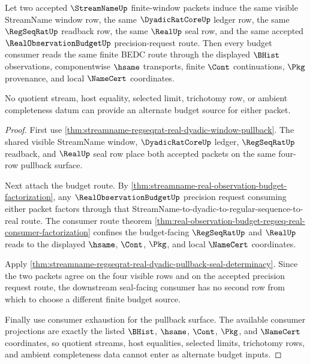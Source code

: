 \begin{theorem}
\label{thm:streamname-real-budget-route-determinacy}
Let two accepted $\StreamNameUp$ finite-window packets induce the same visible
StreamName window row, the same $\DyadicRatCoreUp$ ledger row, the same
$\RegSeqRatUp$ readback row, the same $\RealUp$ seal row, and the same accepted
$\RealObservationBudgetUp$ precision-request route. Then every budget consumer
reads the same finite BEDC route through the displayed $\BHist$ observations,
componentwise $\hsame$ transports, finite $\Cont$ continuations, $\Pkg$
provenance, and local $\NameCert$ coordinates.

No quotient stream, host equality, selected limit, trichotomy row, or ambient
completeness datum can provide an alternate budget source for either packet.
\end{theorem}
\begin{proof}
First use
\autoref{thm:streamname-regseqrat-real-dyadic-window-pullback}. The shared
visible StreamName window, $\DyadicRatCoreUp$ ledger, $\RegSeqRatUp$ readback,
and $\RealUp$ seal row place both accepted packets on the same four-row
pullback surface.

Next attach the budget route. By
\autoref{thm:streamname-real-observation-budget-factorization}, any
$\RealObservationBudgetUp$ precision request consuming either packet factors
through that StreamName-to-dyadic-to-regular-sequence-to-real route. The
consumer route theorem
\autoref{thm:real-observation-budget-regseq-real-consumer-factorization}
confines the budget-facing $\RegSeqRatUp$ and $\RealUp$ reads to the displayed
$\hsame$, $\Cont$, $\Pkg$, and local $\NameCert$ coordinates.

Apply
\autoref{thm:streamname-regseqrat-real-dyadic-pullback-seal-determinacy}. Since
the two packets agree on the four visible rows and on the accepted precision
request route, the downstream seal-facing consumer has no second row from which
to choose a different finite budget source.

Finally use consumer exhaustion for the pullback surface. The available
consumer projections are exactly the listed $\BHist$, $\hsame$, $\Cont$,
$\Pkg$, and $\NameCert$ coordinates, so quotient streams, host equalities,
selected limits, trichotomy rows, and ambient completeness data cannot enter as
alternate budget inputs.
\end{proof}


